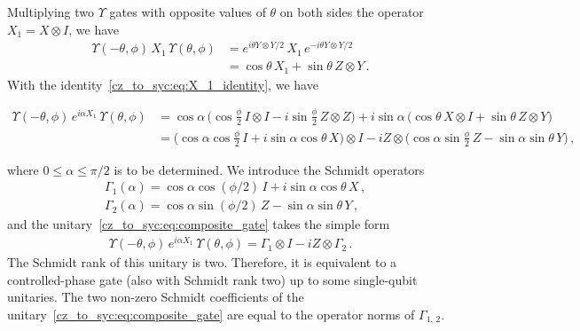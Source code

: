 Multiplying two $\Upsilon$ gates with opposite values of $\theta$ on both sides the operator $X_1 = X\otimes I$, we have
\begin{align}
 \Upsilon(-\theta, \phi)\, X_1\, \Upsilon(\theta, \phi)&= e^{i\theta Y\otimes Y /2}\, X_1\,e^{-i\theta Y\otimes Y /2}\nonumber\\
 &= \cos\theta\, X_1 + \sin\theta\, Z\otimes Y\,.\label{cz_to_syc:eq:X_1_identity}
\end{align}
With the identity~\eqref{cz_to_syc:eq:X_1_identity}, we have
\begin{widetext}
\begin{align}
 \Upsilon(-\theta, \phi)\, e^{i\alpha X_1}\, \Upsilon(\theta, \phi)
 &= \cos\alpha\, \Big(\cos\frac{\phi}{2}\,I\otimes I -i\sin\frac{\phi}{2}\, Z\otimes Z\Big) + i\sin\alpha\, \Big(\cos\theta\, X\otimes I + \sin\theta\, Z\otimes Y\Big)\nonumber\\[3pt]
 &= \Big(\cos\alpha\cos\frac{\phi}{2}\, I + i\sin\alpha\cos\theta\, X\Big) \otimes I - i Z\otimes \Big(\cos\alpha\sin\frac{\phi}{2}\, Z - \sin\alpha\sin\theta\, Y\Big)\,,\label{cz_to_syc:eq:composite_gate}
\end{align}
\end{widetext}
where $0 \leq\alpha\leq \pi/2$ is to be determined.  We introduce the Schmidt operators
\begin{align}
    &\Gamma_1(\alpha) = \cos\alpha\cos(\phi/2)\, I + i\sin\alpha\cos\theta\, X\,,\\[3pt]
    &\Gamma_2(\alpha) = \cos\alpha\sin(\phi/2)\, Z - \sin\alpha\sin\theta\, Y\,,
\end{align}
and the unitary~\eqref{cz_to_syc:eq:composite_gate} takes the simple form
\begin{align}\label{cz_to_syc:eq:composite_gate_schmidt}
  \Upsilon(-\theta, \phi)\, e^{i\alpha X_1}\, \Upsilon(\theta, \phi) =  \Gamma_1\otimes I -iZ\otimes \Gamma_2\,.
\end{align}
The Schmidt rank of this unitary is two.  Therefore, it is equivalent to a controlled-phase gate (also with Schmidt rank two) up to some single-qubit unitaries.  The two non-zero Schmidt coefficients of the unitary~\eqref{cz_to_syc:eq:composite_gate} are equal to the operator norms of $\Gamma_{1,\,2}$.  


